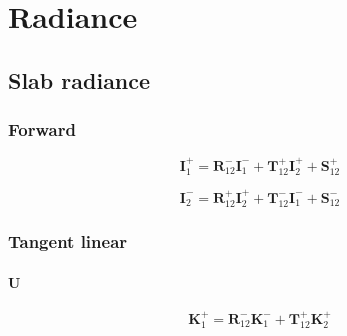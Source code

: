 %
\section{Radiance}
\label{sec:radiance}

\subsection{Slab radiance}
\label{sec:radiance-slab_radiance}

\subsubsection{Forward}
\label{sec:radiance-slab_radiance-forward}

\begin{equation}
\mathbf{I}^{+}_{1} = \mathbf{R}^{-}_{12}\mathbf{I}^{-}_{1} + \mathbf{T}^{+}_{12}\mathbf{I}^{+}_{2} + \mathbf{S}^{+}_{12}
\label{eq:radiance-slab_radiance-forward_I_p_0}
\end{equation}

\begin{equation}
\mathbf{I}^{-}_{2} = \mathbf{R}^{+}_{12}\mathbf{I}^{+}_{2} + \mathbf{T}^{-}_{12}\mathbf{I}^{-}_{1} + \mathbf{S}^{-}_{12}
\label{eq:radiance-slab_radiance-forward_I_m_tau}
\end{equation}


%
\subsubsection{Tangent linear}
\label{sec:radiance-slab_radiance-tangent_linear}

\paragraph{U}
\label{sec:radiance-boa_radiance-tangent_linear-u}

\begin{equation}
\mathbf{K}^{+}_{1} = \mathbf{R}^{-}_{12}\mathbf{K}^{-}_{1} + \mathbf{T}^{+}_{12}\mathbf{K}^{+}_{2}
\label{eq:radiance-slab_radiance-tangent_linear-b_K_p_0}
\end{equation}

